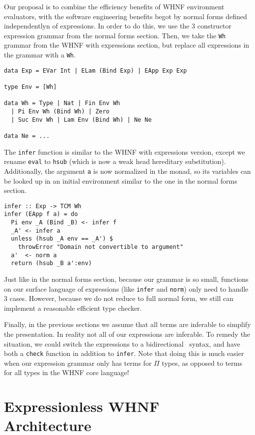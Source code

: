 \documentclass[preprint,authoryear]{sigplanconf}
\begin{document}
Our proposal is to combine the efficiency benefits of WHNF environment
evaluators, with the software engineering benefits begot by
normal forms defined independentlyn of expressions. In order to do
this, we use the 3 constructor expression grammar from the normal
forms section. Then, we take the \texttt{Wh} grammar from the WHNF
with expressions section, but replace all expressions in the grammar
with a \texttt{Wh}.

\begin{verbatim}
data Exp = EVar Int | ELam (Bind Exp) | EApp Exp Exp

type Env = [Wh]

data Wh = Type | Nat | Fin Env Wh
  | Pi Env Wh (Bind Wh) | Zero
  | Suc Env Wh | Lam Env (Bind Wh) | Ne Ne

data Ne = ...
\end{verbatim}

The \texttt{infer} function is similar to the WHNF with expressions
version, except we rename \texttt{eval} to \texttt{hsub} (which is now a
weak head hereditary substitution). Additionally, the argument
\texttt{a} is now normalized in the monad, so its variables can be
looked up in an initial environment similar to the one in the normal
forms section.

\begin{verbatim}
infer :: Exp -> TCM Wh
infer (EApp f a) = do
  Pi env _A (Bind _B) <- infer f
  _A' <- infer a
  unless (hsub _A env == _A') $
    throwError "Domain not convertible to argument"
  a'  <- norm a
  return (hsub _B a':env)
\end{verbatim}

Just like in the normal forms section, because our grammar is so
small, functions on our surface language of expressions (like
\texttt{infer} and \texttt{norm}) only need to handle 3 cases.
However, because we do not reduce to full normal form, we still can
implement a reasonable efficient type checker.

Finally, in the previous sections we assume that all terms are
inferable to simplify the presentation. In reality not all of our expressions
are inferable. To remedy the situation, we could switch the
expressions to a bidirectional~\cite{TODO} syntax, and have both a \texttt{check}
function in addition to \texttt{infer}. Note that doing this is much
easier when our expression grammar only has terms for $\Pi$ types, as
opposed to terms for all types in the WHNF core language!

\section{Expressionless WHNF Architecture}
\end{document}
